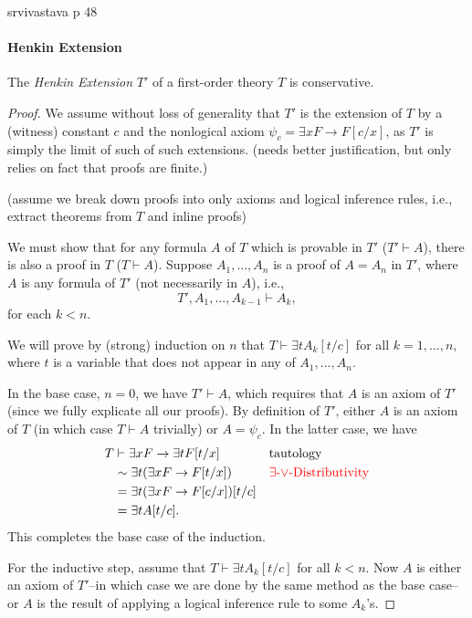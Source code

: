 \documentclass[12pt]{article}
\newlength{\myparskip}
\newenvironment{fullbox}{\begin{lrbox}{\savefullbox}\begin{minipage}{\dimexpr\textwidth-2\fboxsep\relax}\setlength{\parskip}{\myparskip}}{\end{minipage}\end{lrbox}\framebox[\textwidth]{\usebox{\savefullbox}}}
\newenvironment{pbox}[1][]{\begin{fullbox}\def\temp{#1}\ifx\temp\empty\else\paragraph{#1}\phantom{}\fi}{\end{fullbox}}
\theoremstyle{definition}
\newcommand{\<}{\langle}
\renewcommand{\>}{\rangle}
\begin{document}
srvivastava p 48

\newpage

\begin{pbox}[Henkin Extension]
    The \emph{Henkin Extension} $T'$ of a first-order theory $T$ is conservative.
\end{pbox}

\begin{proof}
    We assume without loss of generality that $T'$ is the extension of $T$ by a (witness) constant $c$ and the nonlogical axiom $\psi_c = \exists x F \to F[c/x]$, as $T'$ is simply the limit of such of such extensions. (needs better justification, but only relies on fact that proofs are finite.)

    (assume we break down proofs into only axioms and logical inference rules, i.e., extract theorems from $T$ and inline proofs)

    We must show that for any formula $A$ of $T$ which is provable in $T'$ ($T' \vdash A$), there is also a proof in $T$ ($T \vdash A$). 
    Suppose $A_1, \dots, A_n$ is a proof of $A = A_n$ in $T'$, where $A$ is any formula of $T'$ (not necessarily in $A$), i.e.,
    \[
        T', A_1, \dots, A_{k-1} \vdash A_k,
    \]
    for each $k < n$.
    
    We will prove by (strong) induction on $n$ that $T \vdash \exists{t}A_k[t/c]$ for all $k = 1, \dots, n$, where $t$ is a variable that does not appear in any of $A_1, \dots, A_n$.

    In the base case, $n = 0$, we have $T' \vdash A$, which requires that $A$ is an axiom of $T'$ (since we fully explicate all our proofs). 
    By definition of $T'$, either $A$ is an axiom of $T$ (in which case $T \vdash A$ trivially) or $A = \psi_c$.
    In the latter case, we have
    \begin{align*}
        T 
            &\vdash \exists{x}F \to \exists{t}F[t/x] 
                &&\text{tautology} \\
            &\sim \exists{t}(\exists{x}F \to F[t/x]) 
                &&\text{\textcolor{red}{$\exists$-$\lor$-Distributivity}}\\
            &= \exists{t}(\exists{x}F \to F[c/x])[t/c] \\
            &= \exists{t}A[t/c].
    \end{align*}
    This completes the base case of the induction.

    For the inductive step, assume that $T \vdash \exists{t}A_k[t/c]$ for all $k < n$.
    Now $A$ is either an axiom of $T'$--in which case we are done by the same method as the base case--or $A$ is the result of applying a logical inference rule to some $A_k$'s.


\end{proof}
\end{document}
